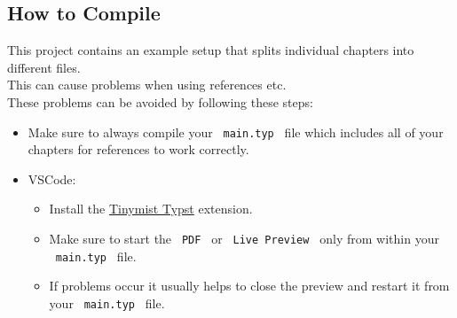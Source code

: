 \begin{Shaded}
\begin{Highlighting}[]




\NormalTok{)}
\end{Highlighting}
\end{Shaded}

\subsection{How to Compile}\label{how-to-compile}

This project contains an example setup that splits individual chapters
into different files.\\
This can cause problems when using references etc.\\
These problems can be avoided by following these steps:

\begin{itemize}
\tightlist
\item
  Make sure to always compile your \texttt{\ main.typ\ } file which
  includes all of your chapters for references to work correctly.
\item
  VSCode:

  \begin{itemize}
  \tightlist
  \item
    Install the
    \href{https://marketplace.visualstudio.com/items?itemName=myriad-dreamin.tinymist}{Tinymist
    Typst} extension.
  \item
    Make sure to start the \texttt{\ PDF\ } or
    \texttt{\ Live\ Preview\ } only from within your
    \texttt{\ main.typ\ } file.
  \item
    If problems occur it usually helps to close the preview and restart
    it from your \texttt{\ main.typ\ } file.
  \end{itemize}
\end{itemize}

